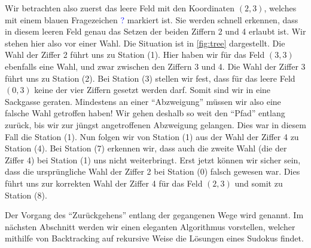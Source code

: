 Wir betrachten also zuerst das leere Feld mit den Koordinaten $(2, 3)$, welches mit einem blauen Fragezeichen \textcolor{Blue}{?} markiert ist. Sie werden schnell erkennen, dass in diesem leeren Feld genau das Setzen der beiden Ziffern 2 und 4 erlaubt ist. Wir stehen hier also vor einer Wahl. Die Situation ist in \cref{fig:tree} dargestellt. Die Wahl der Ziffer 2 führt uns zu Station (1). Hier haben wir für das Feld $(3, 3)$ ebenfalls eine Wahl, und zwar zwischen den Ziffern 3 und 4. Die Wahl der Ziffer 3 führt uns zu Station (2). Bei Station (3) stellen wir fest, dass für das leere Feld $(0, 3)$ keine der vier Ziffern gesetzt werden darf. Somit sind wir in eine Sackgasse geraten. Mindestens an einer \enquote{Abzweigung} müssen wir also eine falsche Wahl getroffen haben! Wir gehen deshalb so weit den \enquote{Pfad} entlang zurück, bis wir zur jüngst angetroffenen Abzweigung gelangen. Dies war in diesem Fall die Station (1). Nun folgen wir von Station (1) aus der Wahl der Ziffer 4 zu Station (4). Bei Station (7) erkennen wir, dass auch die zweite Wahl (die der Ziffer 4) bei Station (1) uns nicht weiterbringt. Erst jetzt können wir sicher sein, dass die ursprüngliche Wahl der Ziffer 2 bei Station (0) falsch gewesen war. Dies führt uns zur korrekten Wahl der Ziffer 4 für das Feld $(2, 3)$ und somit zu Station (8).

Der Vorgang des \enquote{Zurückgehens} entlang der gegangenen Wege wird  genannt. Im nächsten Abschnitt werden wir einen eleganten Algorithmus vorstellen, welcher mithilfe von Backtracking auf rekursive Weise die Lösungen eines Sudokus findet.

